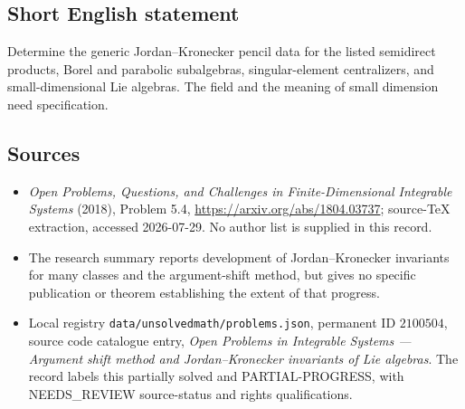 \documentclass[11pt]{article}
\begin{document}
\subsection{Short English statement}
Determine the generic Jordan--Kronecker pencil data for the listed semidirect products, Borel and parabolic subalgebras, singular-element centralizers, and small-dimensional Lie algebras. The field and the meaning of small dimension need specification.
\subsection{Sources}
\begin{itemize}
\item \emph{Open Problems, Questions, and Challenges in Finite-Dimensional Integrable Systems} (2018), Problem 5.4, \url{https://arxiv.org/abs/1804.03737}; source-TeX extraction, accessed 2026-07-29. No author list is supplied in this record.
\item The research summary reports development of Jordan--Kronecker invariants for many classes and the argument-shift method, but gives no specific publication or theorem establishing the extent of that progress.
\item Local registry \texttt{data/unsolvedmath/problems.json}, permanent ID $2100504$, source code catalogue entry, \emph{Open Problems in Integrable Systems --- Argument shift method and Jordan--Kronecker invariants of Lie algebras}. The record labels this partially solved and PARTIAL-PROGRESS, with NEEDS\_REVIEW source-status and rights qualifications.
\end{itemize}
\end{document}
